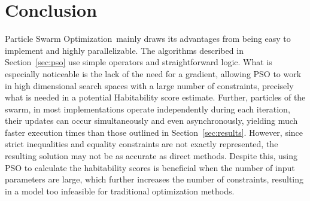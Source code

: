 \documentclass[10pt]{article}
\newcommand{\pso}{Particle Swarm Optimization}
\begin{document}
\begin{table}
  \centering
  \begin{subtable}{\textwidth}
    \centering
    
    \caption{Estimated habitability scores under DRS.}\label{tab:ceesadrs}
  \end{subtable}

  \vspace{4em}

  \begin{subtable}{\textwidth}
    \centering
    
    \caption{Estimated habitability scores under CRS.}\label{tab:ceesacrs}
  \end{subtable}
  \caption{Constant Elasticity Earth Similarity Approach scores as estimated by \pso.\\
      \footnotesize $r$, $d$, $t$, $v$, $e$, $\rho$ and $eta$ record the parameters of Equation~\ref{eq:ceesadrs} in
      Table~\ref{tab:ceesadrs} and the parameters of Equation~\ref{eq:ceesacrs} in Table~\ref{tab:ceesacrs}. However,
      since under the CRS constraint, $\eta=1$, there is no need for the parameter $\eta$ in the problem. The column
      $\mathit{CEESA}$ records the maxima of the objective function. $i$ specifies the number of iterations taken to
      converge to the maxima.
    }
\end{table}


\section{Conclusion}\label{sec:conc}

\pso\ mainly draws its advantages from being easy to implement and highly parallelizable. The algorithms described in
Section~\ref{sec:pso} use simple operators and straightforward logic. What is especially noticeable is the lack of the
need for a gradient, allowing PSO to work in high dimensional search spaces with a large number of constraints,
precisely what is needed in a potential Habitability score estimate. Further, particles of the swarm, in most
implementations operate independently during each iteration, their updates can occur simultaneously and even
asynchronously, yielding much faster execution times than those outlined in Section~\ref{sec:results}. However, since
strict inequalities and equality constraints are not exactly represented, the resulting solution may not be as accurate
as direct methods. Despite this, using PSO to calculate the habitability scores is beneficial when the number of input
parameters are large, which further increases the number of constraints, resulting in a model too infeasible for
traditional optimization methods.
\end{document}
